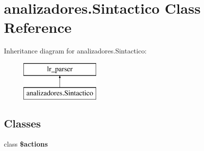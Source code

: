 \hypertarget{classanalizadores_1_1_sintactico}{}\section{analizadores.\+Sintactico Class Reference}
\label{classanalizadores_1_1_sintactico}
Inheritance diagram for analizadores.\+Sintactico\+:\begin{figure}[H]
\begin{center}
\leavevmode
\includegraphics[height=2.000000cm]{classanalizadores_1_1_sintactico}
\end{center}
\end{figure}
\subsection*{Classes}
\begin{DoxyCompactItemize}
\item 
class {\bfseries \$actions}
\end{DoxyCompactItemize}
